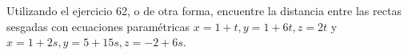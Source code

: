 \item Utilizando el ejercicio 62, o de otra forma, encuentre la distancia entre las rectas sesgadas con ecuaciones paramétricas $x = 1 + t, y = 1 + 6t, z = 2t$ y $x = 1 + 2s, y = 5 + 15s, z = -2 + 6s$.
